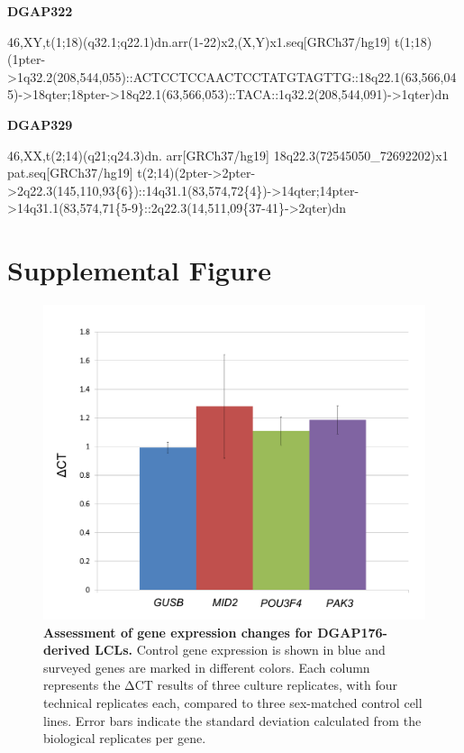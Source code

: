 \documentclass[a4paper,twoside=true,openright,parskip=full,chapterprefix=true,11pt,headings=normal,bibliography=totoc,listof=totoc,titlepage=on,captions=tableabove,draft=false]{scrreprt}
\theoremstyle{definition}
\theoremstyle{definition}
\theoremstyle{definition}
\theoremstyle{remark}
\begin{document}
\textbf{DGAP322}

46,XY,t(1;18)(q32.1;q22.1)dn.arr(1-22)x2,(X,Y)x1.seq{[}GRCh37/hg19{]}
t(1;18)(1pter-\textgreater{}1q32.2(208,544,055)::ACTCCTCCAACTCCTATGTAGTTG::18q22.1(63,566,045)-\textgreater{}18qter;18pter-\textgreater{}18q22.1(63,566,053)::TACA::1q32.2(208,544,091)-\textgreater{}1qter)dn

\textbf{DGAP329}

46,XX,t(2;14)(q21;q24.3)dn. arr{[}GRCh37/hg19{]}
18q22.3(72545050\_72692202)x1 pat.seq{[}GRCh37/hg19{]}
t(2;14)(2pter-\textgreater{}2pter-\textgreater{}2q22.3(145,110,93\{6\})::14q31.1(83,574,72\{4\})-\textgreater{}14qter;14pter-\textgreater{}14q31.1(83,574,71\{5-9\}::2q22.3(14,511,09\{37-41\}-\textgreater{}2qter)dn

\hypertarget{supplemental-figure}{%
\section{Supplemental Figure}\label{supplemental-figure}}

\begin{figure}

{\centering \includegraphics[width=0.6\linewidth]{figures/position_effect/FigureS1} 

}

\caption{\textbf{Assessment of gene expression changes
for DGAP176-derived LCLs.} Control gene expression is shown in blue and
surveyed genes are marked in different colors. Each column represents
the ΔCT results of three culture replicates, with four technical
replicates each, compared to three sex-matched control cell lines. Error
bars indicate the standard deviation calculated from the biological
replicates per gene.}\label{fig:position-effect-S1}
\end{figure}
\end{document}
